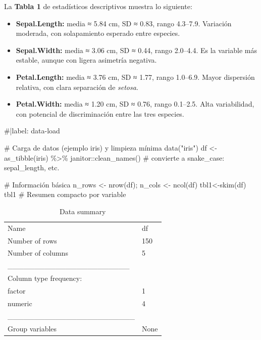 \documentclass[
  spanish,
  11pt,
  a4paper,
  DIV=11,
  numbers=noendperiod]{scrartcl}
\newenvironment{Shaded}{\begin{snugshade}}{\end{snugshade}}
\newcommand{\CommentTok}[1]{\textcolor[rgb]{0.37,0.37,0.37}{#1}}
\newcommand{\FunctionTok}[1]{\textcolor[rgb]{0.28,0.35,0.67}{#1}}
\newcommand{\NormalTok}[1]{\textcolor[rgb]{0.00,0.23,0.31}{#1}}
\newcommand{\OtherTok}[1]{\textcolor[rgb]{0.00,0.23,0.31}{#1}}
\newcommand{\SpecialCharTok}[1]{\textcolor[rgb]{0.37,0.37,0.37}{#1}}
\newcommand{\StringTok}[1]{\textcolor[rgb]{0.13,0.47,0.30}{#1}}
\begin{document}
La \textbf{Tabla 1} de estadísticos descriptivos muestra lo siguiente:

\begin{itemize}
\item
  \textbf{Sepal.Length:} media ≈ 5.84 cm, SD ≈ 0.83, rango 4.3--7.9.
  Variación moderada, con solapamiento esperado entre especies.
\item
  \textbf{Sepal.Width:} media ≈ 3.06 cm, SD ≈ 0.44, rango 2.0--4.4. Es
  la variable más estable, aunque con ligera asimetría negativa.
\item
  \textbf{Petal.Length:} media ≈ 3.76 cm, SD ≈ 1.77, rango 1.0--6.9.
  Mayor dispersión relativa, con clara separación de \emph{setosa}.
\item
  \textbf{Petal.Width:} media ≈ 1.20 cm, SD ≈ 0.76, rango 0.1--2.5. Alta
  variabilidad, con potencial de discriminación entre las tres especies.
\end{itemize}

\begin{Shaded}
\begin{Highlighting}[numbers=left,,]
\CommentTok{\#|label: data{-}load}

\CommentTok{\# Carga de datos (ejemplo iris) y limpieza mínima}
\FunctionTok{data}\NormalTok{(}\StringTok{"iris"}\NormalTok{)}
\NormalTok{df }\OtherTok{\textless{}{-}} \FunctionTok{as\_tibble}\NormalTok{(iris) }\SpecialCharTok{\%\textgreater{}\%} 
\NormalTok{  janitor}\SpecialCharTok{::}\FunctionTok{clean\_names}\NormalTok{()   }\CommentTok{\# convierte a snake\_case: sepal\_length, etc.}

\CommentTok{\# Información básica}
\NormalTok{n\_rows }\OtherTok{\textless{}{-}} \FunctionTok{nrow}\NormalTok{(df); n\_cols }\OtherTok{\textless{}{-}} \FunctionTok{ncol}\NormalTok{(df)}
\NormalTok{tbl1}\OtherTok{\textless{}{-}}\FunctionTok{skim}\NormalTok{(df) }
\NormalTok{tbl1 }\CommentTok{\# Resumen compacto por variable}
\end{Highlighting}
\end{Shaded}

\begin{longtable}[]{@{}ll@{}}
\caption{Data summary}\tabularnewline
\toprule\noalign{}
\endfirsthead
\endhead
\bottomrule\noalign{}
\endlastfoot
Name & df \\
Number of rows & 150 \\
Number of columns & 5 \\
\_\_\_\_\_\_\_\_\_\_\_\_\_\_\_\_\_\_\_\_\_\_\_ & \\
Column type frequency: & \\
factor & 1 \\
numeric & 4 \\
\_\_\_\_\_\_\_\_\_\_\_\_\_\_\_\_\_\_\_\_\_\_\_\_ & \\
Group variables & None \\
\end{longtable}
\end{document}
